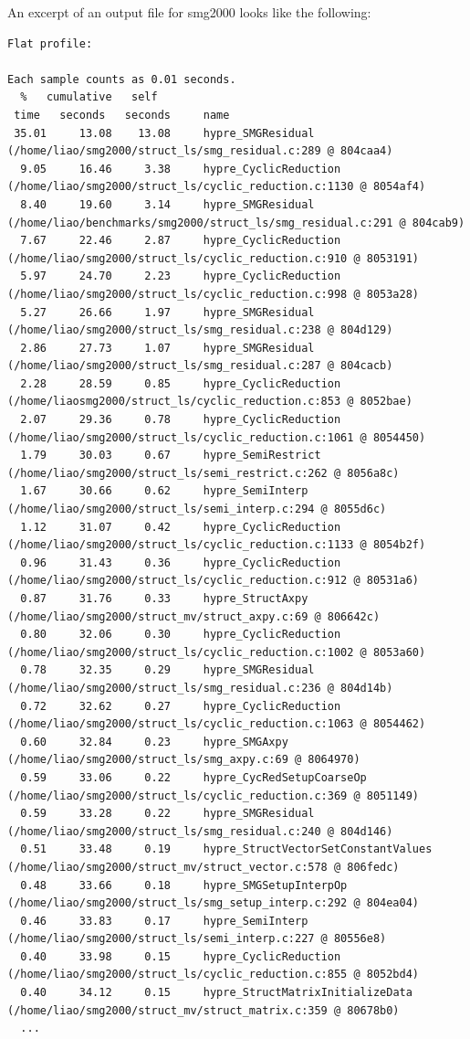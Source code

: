 An excerpt of an output file for smg2000 looks like the following:
{\scriptsize
\begin{verbatim}
Flat profile:

Each sample counts as 0.01 seconds.
  %   cumulative   self     
 time   seconds   seconds     name
 35.01     13.08    13.08     hypre_SMGResidual (/home/liao/smg2000/struct_ls/smg_residual.c:289 @ 804caa4)
  9.05     16.46     3.38     hypre_CyclicReduction (/home/liao/smg2000/struct_ls/cyclic_reduction.c:1130 @ 8054af4)
  8.40     19.60     3.14     hypre_SMGResidual (/home/liao/benchmarks/smg2000/struct_ls/smg_residual.c:291 @ 804cab9)
  7.67     22.46     2.87     hypre_CyclicReduction (/home/liao/smg2000/struct_ls/cyclic_reduction.c:910 @ 8053191)
  5.97     24.70     2.23     hypre_CyclicReduction (/home/liao/smg2000/struct_ls/cyclic_reduction.c:998 @ 8053a28)
  5.27     26.66     1.97     hypre_SMGResidual (/home/liao/smg2000/struct_ls/smg_residual.c:238 @ 804d129)
  2.86     27.73     1.07     hypre_SMGResidual (/home/liao/smg2000/struct_ls/smg_residual.c:287 @ 804cacb)
  2.28     28.59     0.85     hypre_CyclicReduction (/home/liaosmg2000/struct_ls/cyclic_reduction.c:853 @ 8052bae)
  2.07     29.36     0.78     hypre_CyclicReduction (/home/liao/smg2000/struct_ls/cyclic_reduction.c:1061 @ 8054450)
  1.79     30.03     0.67     hypre_SemiRestrict (/home/liao/smg2000/struct_ls/semi_restrict.c:262 @ 8056a8c)
  1.67     30.66     0.62     hypre_SemiInterp (/home/liao/smg2000/struct_ls/semi_interp.c:294 @ 8055d6c)
  1.12     31.07     0.42     hypre_CyclicReduction (/home/liao/smg2000/struct_ls/cyclic_reduction.c:1133 @ 8054b2f)
  0.96     31.43     0.36     hypre_CyclicReduction (/home/liao/smg2000/struct_ls/cyclic_reduction.c:912 @ 80531a6)
  0.87     31.76     0.33     hypre_StructAxpy (/home/liao/smg2000/struct_mv/struct_axpy.c:69 @ 806642c)
  0.80     32.06     0.30     hypre_CyclicReduction (/home/liao/smg2000/struct_ls/cyclic_reduction.c:1002 @ 8053a60)
  0.78     32.35     0.29     hypre_SMGResidual (/home/liao/smg2000/struct_ls/smg_residual.c:236 @ 804d14b)
  0.72     32.62     0.27     hypre_CyclicReduction (/home/liao/smg2000/struct_ls/cyclic_reduction.c:1063 @ 8054462)
  0.60     32.84     0.23     hypre_SMGAxpy (/home/liao/smg2000/struct_ls/smg_axpy.c:69 @ 8064970)
  0.59     33.06     0.22     hypre_CycRedSetupCoarseOp (/home/liao/smg2000/struct_ls/cyclic_reduction.c:369 @ 8051149)
  0.59     33.28     0.22     hypre_SMGResidual (/home/liao/smg2000/struct_ls/smg_residual.c:240 @ 804d146)
  0.51     33.48     0.19     hypre_StructVectorSetConstantValues (/home/liao/smg2000/struct_mv/struct_vector.c:578 @ 806fedc)
  0.48     33.66     0.18     hypre_SMGSetupInterpOp (/home/liao/smg2000/struct_ls/smg_setup_interp.c:292 @ 804ea04)
  0.46     33.83     0.17     hypre_SemiInterp (/home/liao/smg2000/struct_ls/semi_interp.c:227 @ 80556e8)
  0.40     33.98     0.15     hypre_CyclicReduction (/home/liao/smg2000/struct_ls/cyclic_reduction.c:855 @ 8052bd4)
  0.40     34.12     0.15     hypre_StructMatrixInitializeData (/home/liao/smg2000/struct_mv/struct_matrix.c:359 @ 80678b0)
  ...
\end{verbatim}
}




